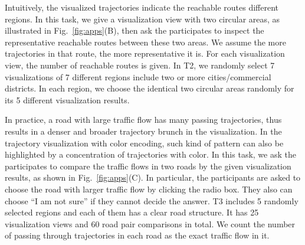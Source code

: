 


Intuitively, the visualized trajectories indicate the reachable routes  different regions.
In this task, we give a visualization view with two circular areas, as illustrated in Fig.~\ref{fig:apps}(B),
then ask the participates to inspect the representative reachable routes between these two areas.
We assume the more trajectories in that route, the more representative it is.
For each visualization view, the number of reachable routes is given.
In T2, we randomly select 7 visualizations of 7 different regions  include two or more cities/commercial districts.
In each region, we choose the identical two circular areas randomly for its 5 different visualization results.


In practice, a road with large traffic flow has many passing trajectories, thus results in a denser and broader trajectory brunch in the visualization.
In the trajectory visualization with color encoding, such kind of pattern can also be highlighted by a concentration of trajectories with  color.
In this task, we ask the participates to compare the traffic flows in two roads by the given visualization results, as shown in Fig.~\ref{fig:apps}(C).
In particular, the participants are asked to choose the road with larger traffic flow by clicking the radio box.
They also can choose ``I am not sure'' if they cannot decide the answer.
T3 includes 5 randomly selected regions and each of them has a clear road structure.
It has 25 visualization views and 60 road pair comparisons in total.
We count the number of passing through trajectories in each road as the exact traffic flow in it.




